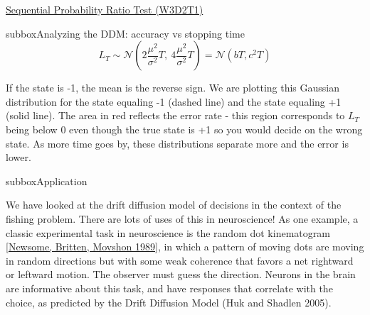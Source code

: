 \begin{textbox}{\href{https://compneuro.neuromatch.io/tutorials/W3D2_HiddenDynamics/student/W3D2_Tutorial1.html}{Sequential Probability Ratio Test (W3D2T1)}   }
\begin{subbox}{subbox}{Analyzing the DDM: accuracy vs stopping time}
\begin{equation}
L_T\sim\mathcal{N}\left(2\frac{\mu^2}{\sigma^2}T,\ 4\frac{\mu^2}{\sigma^2}T\right)=\mathcal{N}(bT,c^2T)
\end{equation}

If the state is -1, the mean is the reverse sign. We are plotting this Gaussian distribution for the state equaling -1 (dashed line) and the state equaling +1 (solid line). The area in red reflects the error rate - this region corresponds to $L_T$ being below 0 even though the true state is +1 so you would decide on the wrong state. As more time goes by, these distributions separate more and the error is lower.

\end{subbox}
\begin{subbox}{subbox}{Application}
\scriptsize


We have looked at the drift diffusion model of decisions in the context of the fishing problem. There are lots of uses of this in neuroscience! As one example, a classic experimental task in neuroscience is the random dot kinematogram \href{https://www.nature.com/articles/341052a0.pdf}{[Newsome, Britten, Movshon 1989]}, in which a pattern of moving dots are moving in random directions but with some weak coherence that favors a net rightward or leftward motion. The observer must guess the direction. Neurons in the brain are informative about this task, and have responses that correlate with the choice, as predicted by the Drift Diffusion Model (Huk and Shadlen 2005).

\end{subbox}
\end{textbox}
\newpage
